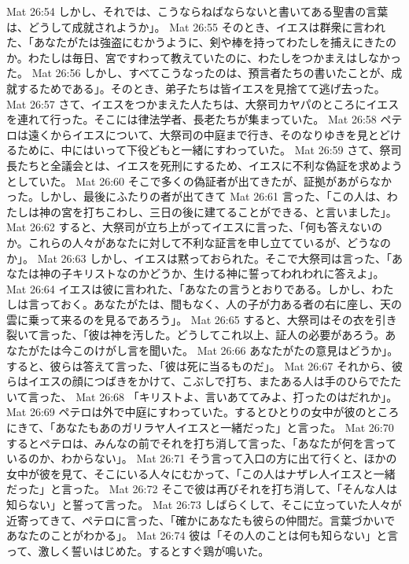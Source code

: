 Mat 26:54  しかし、それでは、こうならねばならないと書いてある聖書の言葉は、どうして成就されようか」。
Mat 26:55  そのとき、イエスは群衆に言われた、「あなたがたは強盗にむかうように、剣や棒を持ってわたしを捕えにきたのか。わたしは毎日、宮ですわって教えていたのに、わたしをつかまえはしなかった。
Mat 26:56  しかし、すべてこうなったのは、預言者たちの書いたことが、成就するためである」。そのとき、弟子たちは皆イエスを見捨てて逃げ去った。
Mat 26:57  さて、イエスをつかまえた人たちは、大祭司カヤパのところにイエスを連れて行った。そこには律法学者、長老たちが集まっていた。
Mat 26:58  ペテロは遠くからイエスについて、大祭司の中庭まで行き、そのなりゆきを見とどけるために、中にはいって下役どもと一緒にすわっていた。
Mat 26:59  さて、祭司長たちと全議会とは、イエスを死刑にするため、イエスに不利な偽証を求めようとしていた。
Mat 26:60  そこで多くの偽証者が出てきたが、証拠があがらなかった。しかし、最後にふたりの者が出てきて
Mat 26:61  言った、「この人は、わたしは神の宮を打ちこわし、三日の後に建てることができる、と言いました」。
Mat 26:62  すると、大祭司が立ち上がってイエスに言った、「何も答えないのか。これらの人々があなたに対して不利な証言を申し立てているが、どうなのか」。
Mat 26:63  しかし、イエスは黙っておられた。そこで大祭司は言った、「あなたは神の子キリストなのかどうか、生ける神に誓ってわれわれに答えよ」。
Mat 26:64  イエスは彼に言われた、「あなたの言うとおりである。しかし、わたしは言っておく。あなたがたは、間もなく、人の子が力ある者の右に座し、天の雲に乗って来るのを見るであろう」。
Mat 26:65  すると、大祭司はその衣を引き裂いて言った、「彼は神を汚した。どうしてこれ以上、証人の必要があろう。あなたがたは今このけがし言を聞いた。
Mat 26:66  あなたがたの意見はどうか」。すると、彼らは答えて言った、「彼は死に当るものだ」。
Mat 26:67  それから、彼らはイエスの顔につばきをかけて、こぶしで打ち、またある人は手のひらでたたいて言った、
Mat 26:68  「キリストよ、言いあててみよ、打ったのはだれか」。
Mat 26:69  ペテロは外で中庭にすわっていた。するとひとりの女中が彼のところにきて、「あなたもあのガリラヤ人イエスと一緒だった」と言った。
Mat 26:70  するとペテロは、みんなの前でそれを打ち消して言った、「あなたが何を言っているのか、わからない」。
Mat 26:71  そう言って入口の方に出て行くと、ほかの女中が彼を見て、そこにいる人々にむかって、「この人はナザレ人イエスと一緒だった」と言った。
Mat 26:72  そこで彼は再びそれを打ち消して、「そんな人は知らない」と誓って言った。
Mat 26:73  しばらくして、そこに立っていた人々が近寄ってきて、ペテロに言った、「確かにあなたも彼らの仲間だ。言葉づかいであなたのことがわかる」。
Mat 26:74  彼は「その人のことは何も知らない」と言って、激しく誓いはじめた。するとすぐ鶏が鳴いた。
